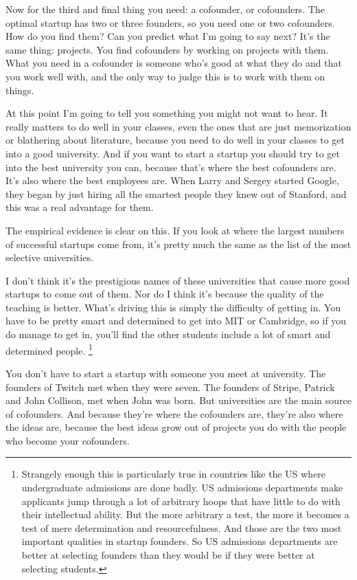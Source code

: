 \documentclass[12pt]{book}
\begin{document}
Now for the third and final thing you need: a cofounder, or cofounders.
The optimal startup has two or three founders, so you need one or two
cofounders. How do you find them? Can you predict what I'm going to say
next? It's the same thing: projects. You find cofounders by working on
projects with them. What you need in a cofounder is someone who's good
at what they do and that you work well with, and the only way to judge
this is to work with them on things.

At this point I'm going to tell you something you might not want to
hear. It really matters to do well in your classes, even the ones that
are just memorization or blathering about literature, because you need
to do well in your classes to get into a good university. And if you
want to start a startup you should try to get into the best university
you can, because that's where the best cofounders are. It's also where
the best employees are. When Larry and Sergey started Google, they began
by just hiring all the smartest people they knew out of Stanford, and
this was a real advantage for them.

The empirical evidence is clear on this. If you look at where the
largest numbers of successful startups come from, it's pretty much the
same as the list of the most selective universities.

I don't think it's the prestigious names of these universities that
cause more good startups to come out of them. Nor do I think it's
because the quality of the teaching is better. What's driving this is
simply the difficulty of getting in. You have to be pretty smart and
determined to get into MIT or Cambridge, so if you do manage to get in,
you'll find the other students include a lot of smart and determined
people. \footnote{Strangely enough this is particularly true in countries like the
US where undergraduate admissions are done badly. US admissions
departments make applicants jump through a lot of arbitrary hoops that
have little to do with their intellectual ability. But the more
arbitrary a test, the more it becomes a test of mere determination and
resourcefulness. And those are the two most important qualities in
startup founders. So US admissions departments are better at selecting
founders than they would be if they were better at selecting students.}

You don't have to start a startup with someone you meet at university.
The founders of Twitch met when they were seven. The founders of Stripe,
Patrick and John Collison, met when John was born. But universities are
the main source of cofounders. And because they're where the cofounders
are, they're also where the ideas are, because the best ideas grow out
of projects you do with the people who become your cofounders.
\end{document}
